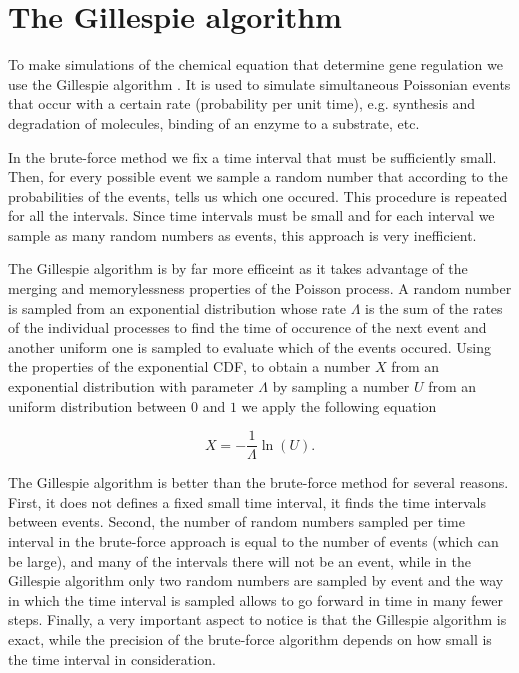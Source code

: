 \section{The Gillespie algorithm}

To make simulations of the chemical equation that determine gene regulation we use the Gillespie algorithm \cite{gillespie77}. It is used to simulate simultaneous Poissonian events that occur with a certain rate (probability per unit time), e.g. synthesis and degradation of molecules, binding of an enzyme to a substrate, etc.

In the brute-force method we fix a time interval that must be sufficiently small. Then, for every possible event we sample a random number that according to the probabilities of the events, tells us which one occured. This procedure is repeated for all the intervals. Since time intervals must be small and for each interval we sample as many random numbers as events, this approach is very inefficient.

The Gillespie algorithm is by far more efficeint as it takes advantage of the merging and memorylessness properties of the Poisson process. A random number is sampled from an exponential distribution whose rate $\Lambda$ is the sum of the rates of the individual processes to find the time of occurence of the next event and another uniform one is sampled to evaluate which of the events occured. Using the properties of the exponential CDF, to obtain a number $X$ from an exponential distribution with parameter $\Lambda$ by sampling a number $U$ from an uniform distribution between $0$ and $1$ we apply the following equation

\begin{equation*}
  X = -\frac{1}{\Lambda}\ln(U).
\end{equation*}

The Gillespie algorithm is better than the brute-force method for several reasons. First, it does not defines a fixed small time interval, it finds the time intervals between events. Second, the number of random numbers sampled per time interval in the brute-force approach is equal to the number of events (which can be large), and many of the intervals there will not be an event, while in the Gillespie algorithm only two random numbers are sampled by event and the way in which the time interval is sampled allows to go forward in time in many fewer steps. Finally, a very important aspect to notice is that the Gillespie algorithm is exact, while the precision of the brute-force algorithm depends on how small is the time interval in consideration.
